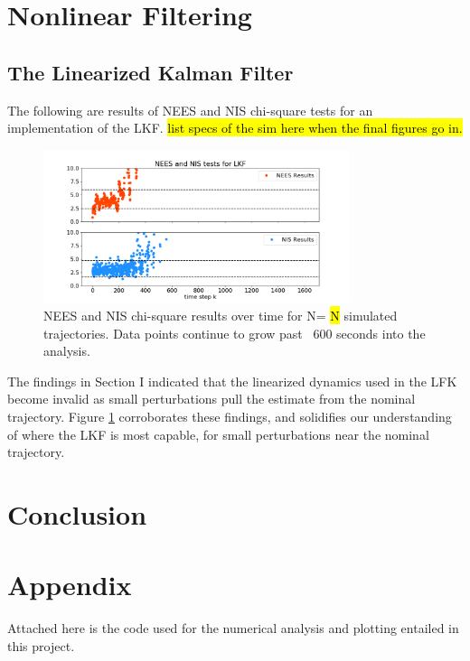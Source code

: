 \documentclass[11pt, a4paper]{article}
\begin{document}
\section{Nonlinear Filtering}

\subsection{The Linearized Kalman Filter}
The following are results of NEES and NIS chi-square tests for an implementation of the LKF. \hl{list specs of the sim here when the final figures go in.}

\begin{figure}[H]
	\centering
	\includegraphics[width=0.8\textwidth]{./Figures/NEESNIS_lkf.png}
	\caption{NEES and NIS chi-square results over time for N= \hl{N} simulated trajectories. Data points continue to grow past ~600 seconds into the analysis.}
	\label{fig:neesnis_lkf}
\end{figure}

The findings in Section I indicated that the linearized dynamics used in the LFK become invalid as small perturbations pull the estimate from the nominal trajectory. 
Figure \ref{fig:neesnis_lkf} corroborates these findings, and solidifies our understanding of where the LKF is most capable, for small perturbations near the nominal trajectory.  





\section{Conclusion}




\newpage
\section*{Appendix}
Attached here is the code used for the numerical analysis and plotting entailed in this project.
%
\end{document}

